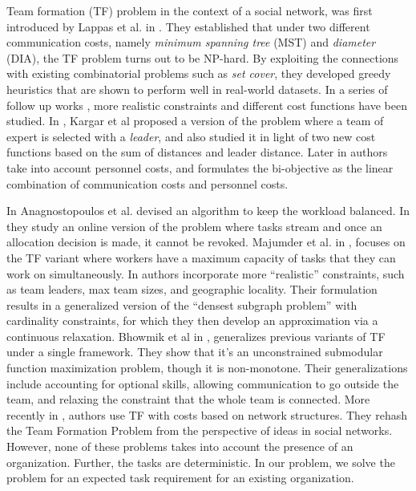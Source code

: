 Team formation (TF) problem in the context of a social network, was first introduced by Lappas et al. in \cite{lappas2009finding}. They established that under two different communication costs, namely \textit{minimum spanning tree} (MST) and \textit{diameter} (DIA), the TF problem turns out to be NP-hard. By exploiting the connections with existing combinatorial problems such as \textit{set cover}, they developed greedy heuristics that are shown to perform well in real-world datasets. In a series of follow up works \cite{anagnostopoulos2010power,kargar2011discovering,anagnostopoulos2012online,majumder2012capacitated,kargar2012efficient,kargar2013finding}, more realistic constraints and different cost functions have been studied. In \cite{kargar2011discovering}, Kargar et al proposed a version of the problem where a team of expert is selected with a \textit{leader}, and also studied it in light of two new cost functions based on the sum of distances and leader distance. Later in \cite{kargar2012efficient,kargar2013finding} authors take into account personnel costs, and formulates the bi-objective as the linear combination of communication costs and personnel costs. 

In \cite{anagnostopoulos2010power} Anagnostopoulos et al. devised an algorithm to keep the workload balanced. In \cite{anagnostopoulos2012online} they study an online version of the problem where tasks stream and once an allocation decision is made, it cannot be revoked. Majumder et al. in \cite{majumder2012capacitated}, focuses on the TF variant where workers have a maximum capacity of tasks that they can work on simultaneously. In \cite{rangapuram2013towards} authors incorporate more ``realistic'' constraints, such as team leaders, max team sizes, and geographic locality. Their formulation results in a generalized version of the ``densest subgraph problem'' with cardinality constraints, for which they then develop an approximation via a continuous relaxation. Bhowmik et al in \cite{bhowmik2014submodularity}, generalizes previous variants of TF under a single framework. They show that it's an unconstrained submodular function maximization problem, though it is non-monotone. Their generalizations include accounting for optional skills, allowing communication to go outside the team, and relaxing the constraint that the whole team is connected. More recently in \cite{farasat2016social}, authors use TF with costs based on network structures. They rehash the Team Formation Problem from the perspective of ideas in social networks. However, none of these problems takes into account the presence of an organization. Further, the tasks are deterministic. In our problem, we solve the problem for an expected task requirement for an existing organization.

